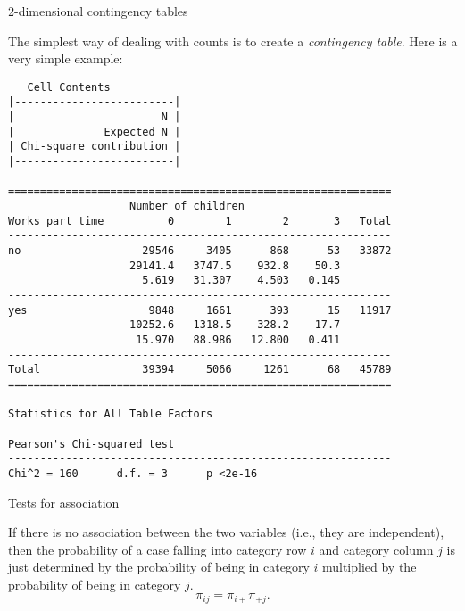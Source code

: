\documentclass[10pt,ignorenonframetext,]{beamer}
\begin{document}
\begin{frame}[fragile]{2-dimensional contingency tables}

The simplest way of dealing with counts is to create a \emph{contingency
table}. Here is a very simple example:

\tiny

\begin{verbatim}
   Cell Contents 
|-------------------------|
|                       N | 
|              Expected N | 
| Chi-square contribution | 
|-------------------------|

============================================================
                   Number of children
Works part time          0        1        2       3   Total
------------------------------------------------------------
no                   29546     3405      868      53   33872
                   29141.4   3747.5    932.8    50.3        
                     5.619   31.307    4.503   0.145        
------------------------------------------------------------
yes                   9848     1661      393      15   11917
                   10252.6   1318.5    328.2    17.7        
                    15.970   88.986   12.800   0.411        
------------------------------------------------------------
Total                39394     5066     1261      68   45789
============================================================

Statistics for All Table Factors

Pearson's Chi-squared test 
------------------------------------------------------------
Chi^2 = 160      d.f. = 3      p <2e-16 
\end{verbatim}

\end{frame}

\begin{frame}{Tests for association}

If there is no association between the two variables (i.e., they are
independent), then the probability of a case falling into category row
\(i\) and category column \(j\) is just determined by the probability of
being in category \(i\) multiplied by the probability of being in
category \(j\). \[
\pi_{ij} = \pi_{i+}\pi_{+j}.
\]

\end{frame}
\end{document}
